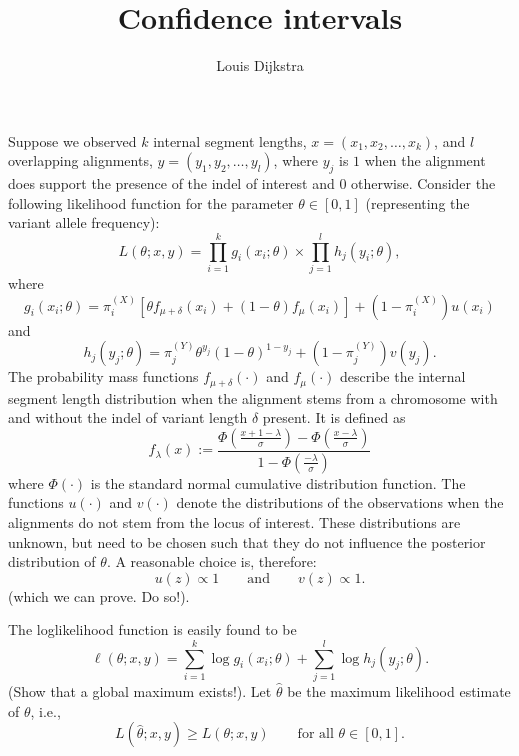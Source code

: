 \documentclass[a4paper,12pt]{article}
\title{Confidence intervals}
\author{Louis Dijkstra}
\begin{document}
\maketitle

Suppose we observed $k$ internal segment lengths, $x = (x_1, x_2, \dots, x_k)$, and $l$ overlapping alignments, $y = (y_1, y_2, \dots, y_l)$, where $y_j$ is $1$ when the alignment does support the presence of the indel of interest and $0$ otherwise. Consider the following likelihood function for the parameter $\theta \in [0,1]$ (representing the variant allele frequency):
\begin{equation}
 L(\theta ; x, y) = \prod_{i=1}^k g_i (x_i ; \theta) \times \prod_{j = 1}^l h_j (y_i ; \theta), 
\end{equation}
where 
\begin{equation}
 g_i (x_i ; \theta) = \pi_i^{(X)} \left[\theta f_{\mu + \delta} (x_i) + (1 - \theta) f_{\mu}(x_i)\right] + \left(1 - \pi_i^{(X)}\right) u(x_i)
\end{equation}
and 
\begin{equation}
 h_j (y_j ; \theta) = \pi_j^{(Y)} \theta^{y_j} (1 - \theta)^{1 - y_j} + \left(1 - \pi_j^{(Y)}\right) v(y_j). 
\end{equation}
The probability mass functions $f_{\mu + \delta}(\cdot)$ and $f_{\mu}(\cdot)$ describe the internal segment length distribution when the alignment stems from a chromosome with and without the indel of variant length $\delta$ present. It is defined as 
\begin{equation}
 f_{\lambda} (x) := \frac{\Phi \left( \frac{x + 1 - \lambda}{\sigma} \right) - \Phi \left( \frac{x - \lambda}{\sigma} \right)}{ 1 - \Phi \left( \frac{- \lambda}{\sigma} \right)}
\end{equation}
where $\Phi(\cdot)$ is the standard normal cumulative distribution function. The functions $u(\cdot)$ and $v(\cdot)$ denote the distributions of the observations when the alignments do not stem from the locus of interest. These distributions are unknown, but need to be chosen such that they do not influence the posterior distribution of $\theta$. A reasonable choice is, therefore: 
$$
  u(z) \propto 1 \qquad \text{and} \qquad v(z) \propto 1. 
$$
(which we can prove. Do so!).

The loglikelihood function is easily found to be 
\begin{equation}
 \ell(\theta; x, y) = \sum_{i=1}^k \log g_i(x_i; \theta) + \sum_{j=1}^l \log h_j (y_j; \theta).
\end{equation}
(Show that a global maximum exists!). 
Let $\widehat{\theta}$ be the maximum likelihood estimate of $\theta$, i.e., 
$$
  L(\widehat{\theta}; x, y) \geq L(\theta; x, y) \qquad \text{for all }\theta \in [0,1].
$$
\end{document}
